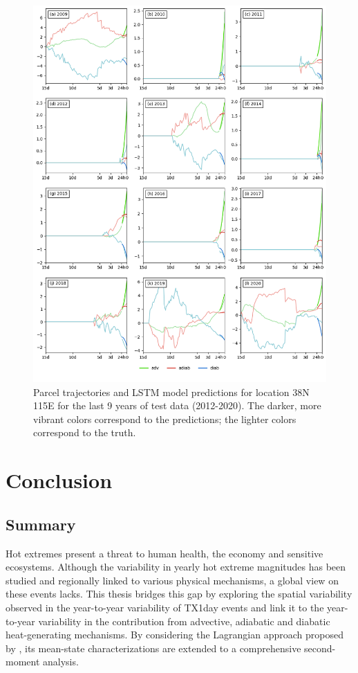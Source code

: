 \documentclass[11pt,a4paper,twoside,openright]{report}
\theoremstyle{definition}
\begin{document}
\begin{figure}[h]
\includegraphics[width=1\linewidth]{images/msegood} \caption{Parcel trajectories and LSTM model predictions for location 38N 115E for the last 9 years of test data (2012-2020). The darker, more vibrant colors correspond to the predictions; the lighter colors correspond to the truth.}\label{fig:msegood}
\end{figure}

\chapter{Conclusion}\label{conclusion}

\section{Summary}\label{summary}

Hot extremes present a threat to human health, the economy and sensitive ecosystems. Although the variability in yearly hot extreme magnitudes has been studied and regionally linked to various physical mechanisms, a global view on these events lacks. This thesis bridges this gap by exploring the spatial variability observed in the year-to-year variability of TX1day events and link it to the year-to-year variability in the contribution from advective, adiabatic and diabatic heat-generating mechanisms. By considering the Lagrangian approach proposed by \cite{rothlisberger_quantifying_2023}, its mean-state characterizations are extended to a comprehensive second-moment analysis.
\end{document}
